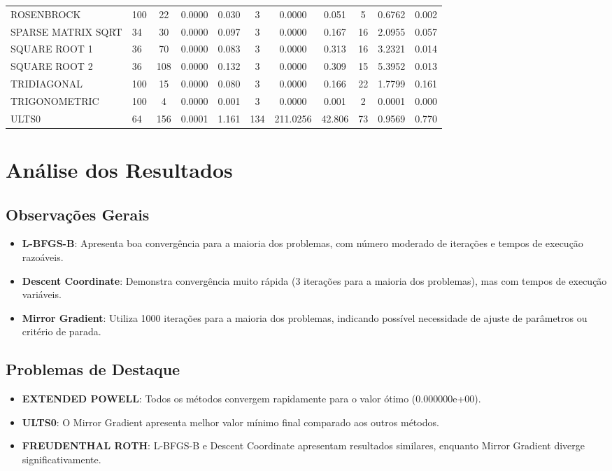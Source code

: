 \documentclass[12pt]{article}
\begin{document}
\begin{landscape}
\begin{table}[h!]
\begin{tabular}{@{}ll|ccc|ccc|ccc@{}}
ROSENBROCK & 100 & 22 & 0.0000 & 0.030 & 3 & 0.0000 & 0.051 & 5 & 0.6762 & 0.002 \\
SPARSE MATRIX SQRT & 34 & 30 & 0.0000 & 0.097 & 3 & 0.0000 & 0.167 & 16 & 2.0955 & 0.057 \\
SQUARE ROOT 1 & 36 & 70 & 0.0000 & 0.083 & 3 & 0.0000 & 0.313 & 16 & 3.2321 & 0.014 \\
SQUARE ROOT 2 & 36 & 108 & 0.0000 & 0.132 & 3 & 0.0000 & 0.309 & 15 & 5.3952 & 0.013 \\
TRIDIAGONAL & 100 & 15 & 0.0000 & 0.080 & 3 & 0.0000 & 0.166 & 22 & 1.7799 & 0.161 \\
TRIGONOMETRIC & 100 & 4 & 0.0000 & 0.001 & 3 & 0.0000 & 0.001 & 2 & 0.0001 & 0.000 \\
ULTS0 & 64 & 156 & 0.0001 & 1.161 & 134 & 211.0256 & 42.806 & 73 & 0.9569 & 0.770 \\

\bottomrule
\end{tabular}
\end{table}
\end{landscape}

\section{Análise dos Resultados}

\subsection{Observações Gerais}

\begin{itemize}
\item \textbf{L-BFGS-B}: Apresenta boa convergência para a maioria dos problemas, com número moderado de iterações e tempos de execução razoáveis.
\item \textbf{Descent Coordinate}: Demonstra convergência muito rápida (3 iterações para a maioria dos problemas), mas com tempos de execução variáveis.
\item \textbf{Mirror Gradient}: Utiliza 1000 iterações para a maioria dos problemas, indicando possível necessidade de ajuste de parâmetros ou critério de parada.
\end{itemize}

\subsection{Problemas de Destaque}

\begin{itemize}
\item \textbf{EXTENDED POWELL}: Todos os métodos convergem rapidamente para o valor ótimo (0.000000e+00).
\item \textbf{ULTS0}: O Mirror Gradient apresenta melhor valor mínimo final comparado aos outros métodos.
\item \textbf{FREUDENTHAL ROTH}: L-BFGS-B e Descent Coordinate apresentam resultados similares, enquanto Mirror Gradient diverge significativamente.
\end{itemize}
\end{document}
